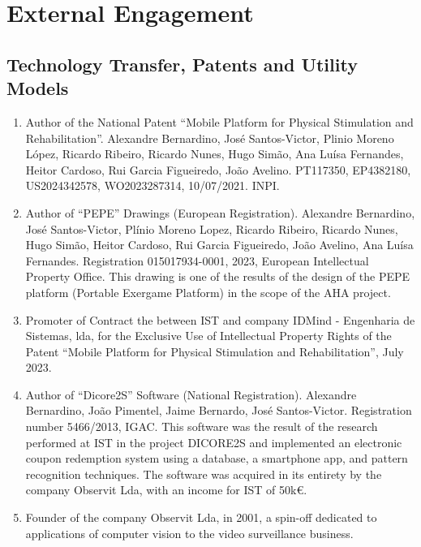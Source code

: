 \section{External Engagement}\label{external-engagement-1}

\subsection{Technology Transfer, Patents and Utility
Models}\label{technology-transfer-patents-and-utility-models}

\begin{enumerate}
\def\labelenumi{\arabic{enumi}.}
\item
  Author of the National Patent ``Mobile Platform for Physical
  Stimulation and Rehabilitation''. Alexandre Bernardino, José
  Santos-Victor, Plinio Moreno López, Ricardo Ribeiro, Ricardo Nunes,
  Hugo Simão, Ana Luísa Fernandes, Heitor Cardoso, Rui Garcia
  Figueiredo, João Avelino. PT117350, EP4382180, US2024342578,
  WO2023287314, 10/07/2021. INPI.
\item
  Author of ``PEPE'' Drawings (European Registration). Alexandre
  Bernardino, José Santos-Victor, Plínio Moreno Lopez, Ricardo Ribeiro,
  Ricardo Nunes, Hugo Simão, Heitor Cardoso, Rui Garcia Figueiredo, João
  Avelino, Ana Luísa Fernandes. Registration 015017934-0001, 2023,
  European Intellectual Property Office. This drawing is one of the
  results of the design of the PEPE platform (Portable Exergame
  Platform) in the scope of the AHA project.
\item
  Promoter of Contract the between IST and company IDMind - Engenharia
  de Sistemas, lda, for the Exclusive Use of Intellectual Property
  Rights of the Patent ``Mobile Platform for Physical Stimulation and
  Rehabilitation'', July 2023.
\item
  Author of ``Dicore2S'' Software (National Registration). Alexandre
  Bernardino, João Pimentel, Jaime Bernardo, José Santos-Victor.
  Registration number 5466/2013, IGAC. This software was the result of
  the research performed at IST in the project DICORE2S and implemented
  an electronic coupon redemption system using a database, a smartphone
  app, and pattern recognition techniques. The software was acquired in
  its entirety by the company Observit Lda, with an income for IST of
  50k€.
\item
  Founder of the company Observit Lda, in 2001, a spin-off dedicated to
  applications of computer vision to the video surveillance business.
\end{enumerate}

